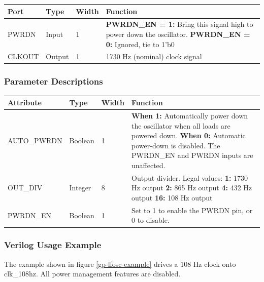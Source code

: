 \documentclass{article}
\begin{document}
\begin{tabularx}{5in}{|l|l|l|X|}
\hline
{\bfseries Port} & {\bfseries Type} & {\bfseries Width} & {\bfseries Function} \\
\hline
PWRDN & Input & 1 &
	{\bfseries PWRDN\_EN = 1:} \newline Bring this signal high to power down the oscillator. \newline
	{\bfseries PWRDN\_EN = 0:} \newline Ignored, tie to 1'b0\\
\hline
CLKOUT & Output & 1 & 1730 Hz (nominal) clock signal \\
\hline
\end{tabularx}

\subsubsection{Parameter Descriptions}

\begin{tabularx}{5in}{|l|l|l|X|}
\hline
{\bfseries Attribute} & {\bfseries Type} & {\bfseries Width} & {\bfseries Function} \\
\hline
AUTO\_PWRDN & Boolean & 1 & 
	{\bfseries When 1: } \newline Automatically power down the oscillator when all loads are powered down. \newline
	{\bfseries When 0: } \newline Automatic power-down is disabled. The PWRDN\_EN and PWRDN inputs are unaffected.\\
\hline
OUT\_DIV & Integer & 8 &
	Output divider. Legal values: \newline
	{\bfseries 1:} 1730 Hz output \newline
	{\bfseries 2:} 865 Hz output \newline
	{\bfseries 4:} 432 Hz output \newline
	{\bfseries 16:} 108 Hz output
\\
\hline
PWRDN\_EN & Boolean & 1 & Set to 1 to enable the PWRDN pin, or 0 to disable. \\
\hline
\end{tabularx}

\subsubsection{Verilog Usage Example}

The example shown in figure \ref{gp-lfosc-example} drives a 108 Hz clock onto clk\_108hz. All power management features 
are disabled.
\end{document}
